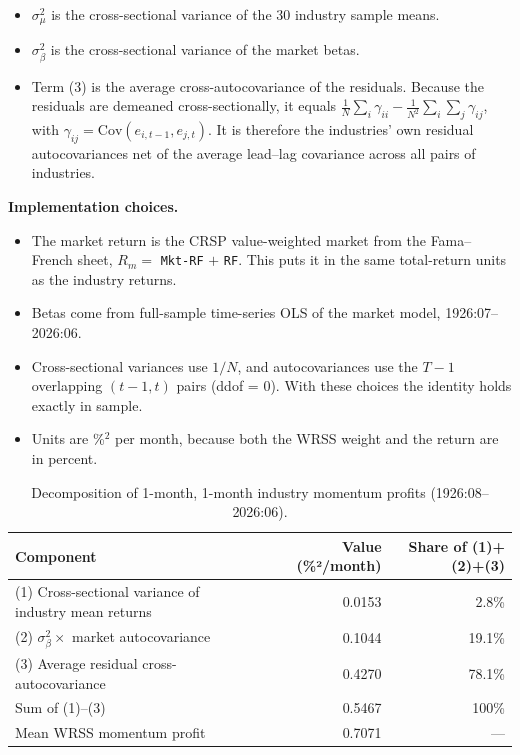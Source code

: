 \documentclass[11pt]{article}
\begin{document}
\begin{itemize}
  \item $\sigma^2_\mu$ is the cross-sectional variance of the 30 industry sample means.
  \item $\sigma^2_\beta$ is the cross-sectional variance of the market betas.
  \item Term (3) is the average cross-autocovariance of the residuals. Because the residuals are demeaned cross-sectionally, it equals $\frac{1}{N}\sum_i\gamma_{ii}-\frac{1}{N^2}\sum_i\sum_j\gamma_{ij}$, with $\gamma_{ij}=\mathrm{Cov}(e_{i,t-1},e_{j,t})$. It is therefore the industries' own residual autocovariances net of the average lead–lag covariance across all pairs of industries.
\end{itemize}
 
\textbf{Implementation choices.}
 
\begin{itemize}
  \item The market return is the CRSP value-weighted market from the Fama–French sheet, $R_m=$ \texttt{Mkt-RF} $+$ \texttt{RF}. This puts it in the same total-return units as the industry returns.
  \item Betas come from full-sample time-series OLS of the market model, 1926:07–2026:06.
  \item Cross-sectional variances use $1/N$, and autocovariances use the $T-1$ overlapping $(t-1,t)$ pairs (ddof = 0). With these choices the identity holds exactly in sample.
  \item Units are \%$^2$ per month, because both the WRSS weight and the return are in percent.
\end{itemize}
 
\begin{table}[H]
\centering
\caption{Decomposition of 1-month, 1-month industry momentum profits (1926:08–2026:06).}
\label{tab:decomp}
\begin{tabularx}{\textwidth}{Xrr}
\toprule
Component & Value (\%²/month) & Share of (1)+(2)+(3) \\
\midrule
(1) Cross-sectional variance of industry mean returns & 0.0153 & 2.8\% \\
(2) $\sigma^2_\beta \times$ market autocovariance & 0.1044 & 19.1\% \\
(3) Average residual cross-autocovariance & 0.4270 & 78.1\% \\
\midrule
Sum of (1)–(3) & 0.5467 & 100\% \\
Mean WRSS momentum profit & 0.7071 & — \\
\bottomrule
\end{tabularx}
\end{table}
 
\end{document}
